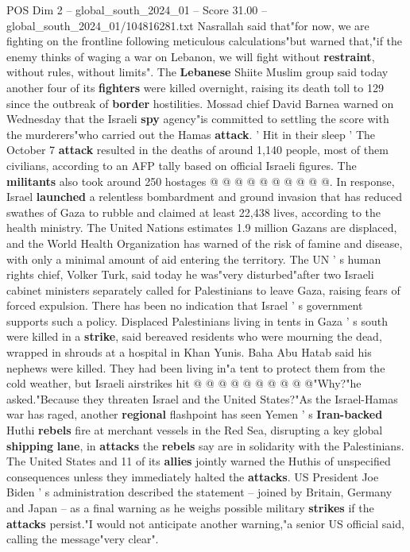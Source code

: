 \begin{textsample}{POS Dim 2 – global\_south\_2024\_01 – Score 31.00 – global\_south\_2024\_01/104816281.txt}
Nasrallah said that"for now, we are fighting on the frontline following meticulous calculations"but warned that,"if the enemy thinks of waging a war on Lebanon, we will fight without \textbf{restraint}, without rules, without limits".
The \textbf{Lebanese} Shiite Muslim group said today another four of its \textbf{fighters} were killed overnight, raising its death toll to 129 since the outbreak of \textbf{border} hostilities.
Mossad chief David Barnea warned on Wednesday that the Israeli \textbf{spy} agency"is committed to settling the score with the murderers"who carried out the Hamas \textbf{attack}. ' Hit in their sleep ' The October 7 \textbf{attack} resulted in the deaths of around 1,140 people, most of them civilians, according to an AFP tally based on official Israeli figures.
The \textbf{militants} also took around 250 hostages @ @ @ @ @ @ @ @ @ @.
In response, Israel \textbf{launched} a relentless bombardment and ground invasion that has reduced swathes of Gaza to rubble and claimed at least 22,438 lives, according to the health ministry.
The United Nations estimates 1.9 million Gazans are displaced, and the World Health Organization has warned of the risk of famine and disease, with only a minimal amount of aid entering the territory.
The UN ' s human rights chief, Volker Turk, said today he was"very disturbed"after two Israeli cabinet ministers separately called for Palestinians to leave Gaza, raising fears of forced expulsion.
There has been no indication that Israel ' s government supports such a policy.
Displaced Palestinians living in tents in Gaza ' s south were killed in a \textbf{strike}, said bereaved residents who were mourning the dead, wrapped in shrouds at a hospital in Khan Yunis.
Baha Abu Hatab said his nephews were killed.
They had been living in"a tent to protect them from the cold weather, but Israeli airstrikes hit @ @ @ @ @ @ @ @ @ @"Why?"he asked."Because they threaten Israel and the United States?"As the Israel-Hamas war has raged, another \textbf{regional} flashpoint has seen Yemen ' s \textbf{Iran-backed} Huthi \textbf{rebels} fire at merchant vessels in the Red Sea, disrupting a key global \textbf{shipping} \textbf{lane}, in \textbf{attacks} the \textbf{rebels} say are in solidarity with the Palestinians.
The United States and 11 of its \textbf{allies} jointly warned the Huthis of unspecified consequences unless they immediately halted the \textbf{attacks}.
US President Joe Biden ' s administration described the statement -- joined by Britain, Germany and Japan -- as a final warning as he weighs possible military \textbf{strikes} if the \textbf{attacks} persist."I would not anticipate another warning,"a senior US official said, calling the message"very clear".

\end{textsample}
